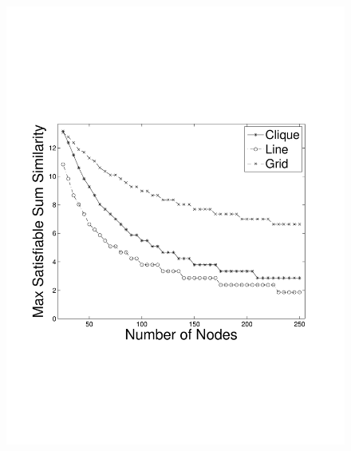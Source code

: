 \begin{figure}
{	\includegraphics[scale=0.22, clip=true, trim=14mm 65mm 25mm 65mm]{sum_sim_vs_num_nodes_50_T_12_IS_2_W.pdf}
        \label{fig:use_case_sum_sim_vs_num_nodes}
        }
  \subfigure[Max Network Size vs. Sum Sim. (Timeliness = 10)]{
}
\end{figure}
